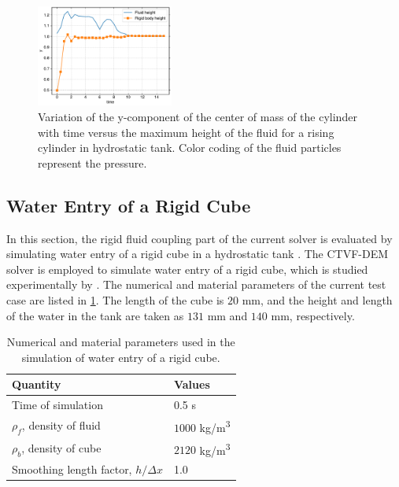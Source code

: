 \begin{figure}[!htpb]
  \centering
  \includegraphics[width=0.4\textwidth]{figures/rfc/figures/dinesh_2022_body_in_hs_tank_2d/ycom}
  \caption{Variation of the y-component of the center of mass of the cylinder
    with time versus the maximum height of the fluid for a rising cylinder in
    hydrostatic tank. Color coding of the fluid particles represent the pressure.}
\label{fig:raising-falling-solid-in-water}
\end{figure}


\FloatBarrier%
\subsection{Water Entry of a Rigid Cube}
\label{sec:falling-solid-in-water}
In this section, the rigid fluid coupling part of the current solver is
evaluated by simulating water entry of a rigid cube in a hydrostatic tank
\citep{qiu_3d_2017}. The CTVF-DEM solver is employed to simulate water entry of
a rigid cube, which is studied experimentally by \cite{wu_two-way_2014}. The
numerical and material parameters of the current test case are listed in
\cref{tab:rfc:qiu-falling-cube}. The length of the cube is $20$ mm, and the
height and length of the water in the tank are taken as $131$ mm and $140$ mm,
respectively.
\begin{table}[!ht]
  \centering
  \begin{tabular}[!ht]{ll}
    \toprule
    Quantity & Values\\
    \midrule
    Time of simulation & 0.5 s \\
    $\rho_f$, density of fluid & $1000$ kg/m\textsuperscript{3} \\
    $\rho_b$, density of cube & $2120$ kg/m\textsuperscript{3} \\
    Smoothing length factor, $h/\Delta x$ & 1.0\\
    \bottomrule
  \end{tabular}
  \caption{Numerical and material parameters used in the simulation of water
    entry of a rigid cube.}%
  \label{tab:rfc:qiu-falling-cube}
\end{table}

